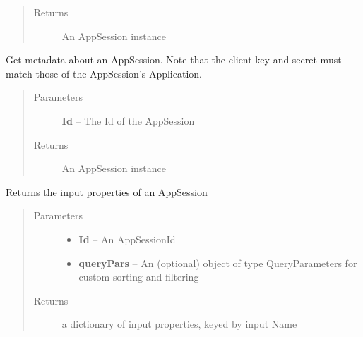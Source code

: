 \documentclass[letterpaper,10pt,english]{sphinxmanual}
\begin{document}
\begin{fulllineitems}
\begin{fulllineitems}
\begin{quote}
\begin{description}
\item[{Returns}] \leavevmode
An AppSession instance

\end{description}\end{quote}

\end{fulllineitems}


\begin{fulllineitems}
\label{Available modules:BaseSpacePy.api.BaseSpaceAPI.BaseSpaceAPI.getAppSessionById}
Get metadata about an AppSession.
Note that the client key and secret must match those of the AppSession's Application.
\begin{quote}\begin{description}
\item[{Parameters}] \leavevmode
\textbf{Id} -- The Id of the AppSession

\item[{Returns}] \leavevmode
An AppSession instance

\end{description}\end{quote}

\end{fulllineitems}


\begin{fulllineitems}
\label{Available modules:BaseSpacePy.api.BaseSpaceAPI.BaseSpaceAPI.getAppSessionInputsById}
Returns the input properties of an AppSession
\begin{quote}\begin{description}
\item[{Parameters}] \leavevmode\begin{itemize}
\item {} 
\textbf{Id} -- An AppSessionId

\item {} 
\textbf{queryPars} -- An (optional) object of type QueryParameters for custom sorting and filtering

\end{itemize}

\item[{Returns}] \leavevmode
a dictionary of input properties, keyed by input Name


\end{description}
\end{quote}
\end{fulllineitems}
\end{fulllineitems}
\end{document}
